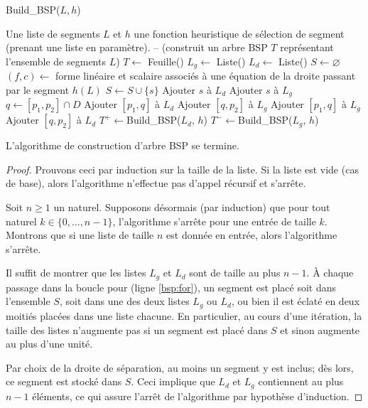 \begin{algorithm}
  \caption{Build\_BSP($L, h$)}
  \begin{algorithmic}[1] \label{algo:bsp}
    \REQUIRE Une liste de segments $L$ et $h$ une fonction
    heuristique de sélection de segment (prenant une liste en paramètre).
    \ENSURE -- (construit un arbre BSP $T$ représentant
    l'ensemble de segments $L$)
    \STATE $T\leftarrow$ Feuille()
    \STATE $L_g\leftarrow$ Liste()
    \STATE $L_d\leftarrow$ Liste()
    \STATE $S \leftarrow \varnothing$
    \STATE $\left(f, c\right)\leftarrow$ forme linéaire et scalaire
    associés à une équation de la droite passant par le segment $h(L)$
     \label{bsp:for}
    \STATE $S\leftarrow S\cup\{s\}$
    \STATE Ajouter $s$ à $L_d$
    \STATE Ajouter $s$ à $L_g$
    \ELSE
    \STATE $q\leftarrow [p_1, p_2]\cap D$
    \STATE Ajouter $[p_1, q]$ à $L_d$
    \STATE Ajouter $[q, p_2]$ à $L_g$
    \ELSE
    \STATE Ajouter $[p_1, q]$ à $L_g$
    \STATE Ajouter $[q, p_2]$ à $L_d$
    \ENDIF
    \ENDIF
    \ENDFOR
    \STATE $T^+\leftarrow$Build\_BSP($L_d$, $h$)
    \STATE $T^-\leftarrow$Build\_BSP($L_g$, $h$)
    \ENDIF
  \end{algorithmic}
\end{algorithm}

\begin{prop}
  L'algorithme de construction d'arbre BSP se termine.
\end{prop}
\begin{proof}
  Prouvons ceci par induction sur la taille de la liste.
  Si la liste est vide (cas de base), alors l'algorithme n'effectue
  pas d'appel récursif et s'arrête.

  Soit $n\geq 1$ un naturel. Supposons désormais (par induction) que pour
  tout naturel $k\in\{0, \ldots, n-1\}$, l'algorithme s'arrête pour
  une entrée de taille $k$. Montrons que si une liste de taille $n$
  est donnée en entrée, alors l'algorithme s'arrête.

  Il suffit de montrer que les listes $L_g$ et $L_d$ sont de taille
  au plus $n-1$. \`{A} chaque passage dans la boucle pour (ligne \ref{bsp:for}), un segment
  est placé soit dans l'ensemble $S$, soit dans une des deux listes
  $L_g$ ou $L_d$, ou bien il est éclaté en deux moitiés placées
  dans une liste chacune. En particulier, au cours d'une itération,
  la taille des listes n'augmente pas si un segment est placé dans $S$
  et sinon augmente au plus d'une unité.

  Par choix de la droite de séparation,
  au moins un segment y est inclus; dès lors, ce segment est stocké
  dans $S$. Ceci implique que $L_d$ et $L_g$ contiennent au plus $n-1$
  éléments, ce qui assure l'arrêt de l'algorithme par hypothèse d'induction.
\end{proof}


